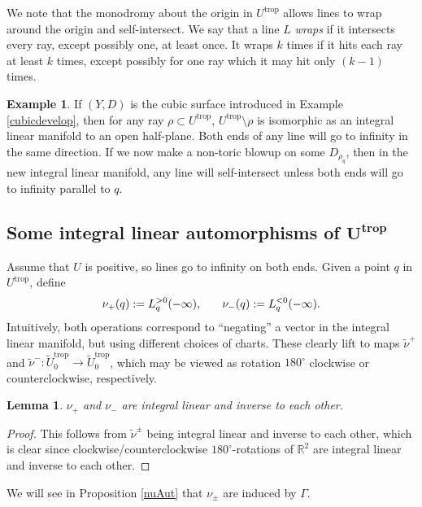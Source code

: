 \documentclass[10pt,a4paper]{amsart}
\numberwithin{equation}{section}
\numberwithin{figure}{section}
\numberwithin{table}{section}
\DeclareMathOperator{\trop}{trop}
\let\bb=\mathbb
\let\rar=\rightarrow
\let\wt=\widetilde
\newtheorem{lem}[thm]{Lemma}
\theoremstyle{definition}
\newtheorem{eg}[thm]{Example}
\begin{document}
We note that the monodromy about the origin in $U^{\trop}$ allows lines to wrap around the origin and self-intersect. We say that a line $L$ {\it wraps} if it intersects every ray, except possibly one, at least once. It wraps $k$ times if it hits each ray at least $k$ times, except possibly for one ray which it may hit only $(k-1)$ times.

\begin{eg} If $(Y,D)$ is the cubic surface introduced in Example \ref{cubicdevelop}, then for any ray $\rho \subset {U^{\trop}}$, $U^{\trop}\setminus \rho$ is isomorphic as an integral linear manifold to an open half-plane. Both ends of any line will go to infinity in the same direction. If we now make a non-toric blowup on some $D_{\rho_q}$, then in the new integral linear manifold, any line will self-intersect unless both ends will go to infinity parallel to $q$.
\end{eg}

\subsection[Some integral linear automorphisms of $U^{\trop}$]{Some integral linear automorphisms of $\boldsymbol{U^{\trop}}$}\label{LinearAuts}

Assume that $U$ is positive, so lines go to infinity on both ends. Given a point $q$ in $U^{\trop}$, define
\begin{gather*}
	\nu_+(q):=L_q^{>0}(-\infty), \hspace{.25 in} \nu_-(q):=L_q^{<0}(-\infty).
\end{gather*}
Intuitively, both operations correspond to ``negating'' a vector in the integral linear manifold, but using different choices of charts. These clearly lift to maps $\wt{\nu}^+$ and $\wt{\nu}^-\colon \wt{U}_0^{\trop}\rar \wt{U}_0^{\trop}$, which may be viewed as rotation $180^{\circ}$ clockwise or counterclockwise, respectively.

\begin{lem}\label{nu}$\nu_+$ and $\nu_-$ are integral linear and inverse to each other.
\end{lem}
\begin{proof}
This follows from $\wt{\nu}^{\pm}$ being integral linear and inverse to each other, which is clear since clockwise/counterclockwise $180^{\circ}$-rotations of $\bb{R}^2$ are integral linear and inverse to each other.
\end{proof}

We will see in Proposition \ref{nuAut} that $\nu_{\pm}$ are induced by $\Gamma$.
\end{document}
